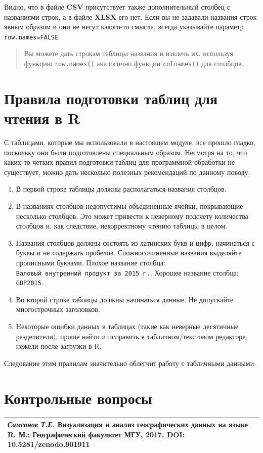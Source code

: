 \documentclass[]{book}
\providecommand{\tightlist}{%
  \setlength{\itemsep}{0pt}\setlength{\parskip}{0pt}}
\begin{document}
Видно, что в файле \textbf{CSV} присутствует также дополнительный
столбец с названиями строк, а в файле \textbf{XLSX} его нет. Если вы не
задавали названия строк явным образом и они не несут какого-то смысла,
всегда указывайте параметр \texttt{row.names=FALSE}

\begin{quote}
Вы можете дать строкам таблицы названия и извлечь их, используя функцию
\texttt{row.names()} аналогично функции \texttt{colnames()} для
столбцов.
\end{quote}

\hypertarget{table_rules}{\section{Правила подготовки таблиц для чтения
в R}\label{table_rules}}

С таблицами, которые мы использовали в настоящем модуле, все прошло
гладко, поскольку они были подготовлены специальным образом. Несмотря на
то, что каких-то четких правил подготовки таблиц для программной
обработки не существует, можно дать несколько полезных рекомендаций по
данному поводу:

\begin{enumerate}
\def\labelenumi{\arabic{enumi}.}
\tightlist
\item
  В первой строке таблицы должны располагаться названия столбцов.
\item
  В названиях столбцов недопустимы объединенные ячейки, покрывающие
  несколько столбцов. Это может привести к неверному подсчету количества
  столбцов и, как следствие, некорректному чтению таблицы в целом.
\item
  Названия столбцов должны состоять из латинских букв и цифр, начинаться
  с буквы и не содержать пробелов. Сложносочиненные названия выделяйте
  прописными буквами. Плохое название столбца:
  \texttt{Валовый\ внутренний\ продукт\ за\ 2015\ г.}. Хорошее название
  столбца: \texttt{GDP2015}.
\item
  Во второй строке таблицы должны начинаться данные. Не допускайте
  многострочных заголовков.
\item
  Некоторые ошибки данных в таблицах (такие как неверные десятичные
  разделители), проще найти и исправить в табличном/текстовом редакторе,
  нежели после загрузки в R.
\end{enumerate}

Следование этим правилам значительно облегчит работу с табличными
данными.

\section{Контрольные вопросы}\label{questions_tables}

\begin{longtable}[]{@{}l@{}}
\toprule
\emph{Самсонов Т.Е.} \textbf{Визуализация и анализ географических данных
на языке R.} М.: Географический факультет МГУ, 2017. DOI:
10.5281/zenodo.901911\tabularnewline
\bottomrule
\end{longtable}


\end{document}
